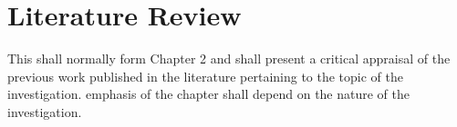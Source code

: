 \chapter{Literature Review}
This shall normally form Chapter 2 and shall present a critical appraisal of the previous work
published in the literature pertaining to the topic of the investigation.
emphasis of the chapter shall depend on the nature of the investigation.\\



